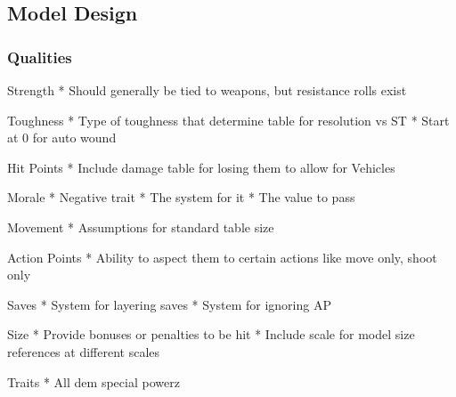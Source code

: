 \begin{multicols*}{2}
	
	\section{Model Design}	
	
	\subsubsection{Qualities}
	
	Strength
	* Should generally be tied to weapons, but resistance rolls exist
	
	Toughness
	* Type of toughness that determine table for resolution vs ST
	* Start at 0 for auto wound
	
	Hit Points
	* Include damage table for losing them to allow for Vehicles
	
	Morale
	* Negative trait
	* The system for it
	* The value to pass
	
	Movement
	* Assumptions for standard table size
	
	Action Points
	* Ability to aspect them to certain actions like move only, shoot only
	
	Saves
	* System for layering saves
	* System for ignoring AP
	
	Size
	* Provide bonuses or penalties to be hit
	* Include scale for model size references at different scales
	
	Traits
	* All dem special powerz
	
	
\end{multicols*}